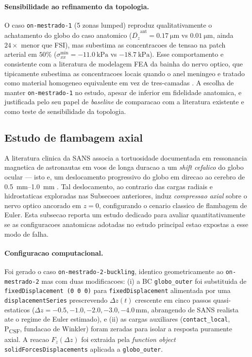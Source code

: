 \paragraph{Sensibilidade ao refinamento da topologia.} O caso \texttt{on-mestrado-1} (5 zonas lumped) reproduz qualitativamente o achatamento do globo do caso anatomico ($\overline{D_z}^{\mathrm{ant}} = \SI{0.17}{\micro\meter}$ vs $\SI{0.01}{\micro\meter}$, ainda $24\times$ menor que FSI), mas subestima as concentracoes de tensao na patch arterial em $50\%$ ($\sigma_{xx}^{\min} = -\SI{11.0}{\kilo\pascal}$ vs $-\SI{18.7}{\kilo\pascal}$). Esse comportamento e consistente com a literatura de modelagem FEA da bainha do nervo optico, que tipicamente subestima as concentracoes locais quando o anel meningeo e tratado como material homogeneo equivalente em vez de tres-camadas \citep{Sigal2004}. A escolha de manter \texttt{on-mestrado-1} no estudo, apesar de inferior em fidelidade anatomica, e justificada pelo seu papel de \emph{baseline} de comparacao com a literatura existente e como teste de sensibilidade da topologia.

\subsection{Estudo de flambagem axial}
\label{sec:resultados-flambagem}

A literatura clinica da SANS associa a tortuosidade documentada em ressonancia magnetica de astronautas em voos de longa duracao a um \emph{shift cefalico} do globo ocular --- isto e, um deslocamento progressivo do globo em direcao ao cerebro de \SIrange{0.5}{1.0}{\milli\meter} \citep{Lee2020NPJ, Mader2011}. Tal deslocamento, ao contrario das cargas radiais e hidrostaticas exploradas nas Subsecoes anteriores, induz \emph{compressao axial} sobre o nervo optico ancorado em $z = 0$, configurando o cenario classico de flambagem de Euler. Esta subsecao reporta um estudo dedicado para avaliar quantitativamente se as configuracoes anatomicas adotadas no estudo principal estao expostas a esse modo de falha.

\paragraph{Configuracao computacional.} Foi gerado o caso \texttt{on-mestrado-2-buckling}, identico geometricamente ao \texttt{on-mestrado-2} mas com duas modificacoes: (i) a BC \texttt{globo\_outer} foi substituida de \texttt{fixedDisplacement (0 0 0)} para \texttt{fixedDisplacement} alimentada por uma \texttt{displacementSeries} prescrevendo $\Delta z(t)$ crescente em cinco passos quasi-estaticos ($\Delta z = -0.5, -1.0, -2.0, -3.0, -4.0\,\si{\milli\meter}$, abrangendo de SANS realista ate o regime de Euler estimado), e (ii) as cargas auxiliares (\texttt{contact\_local}, P\textsubscript{CSF}, fundacao de Winkler) foram zeradas para isolar a resposta puramente axial. A reacao $F_z(\Delta z)$ foi extraida pela \emph{function object} \texttt{solidForcesDisplacements} aplicada a \texttt{globo\_outer}.


